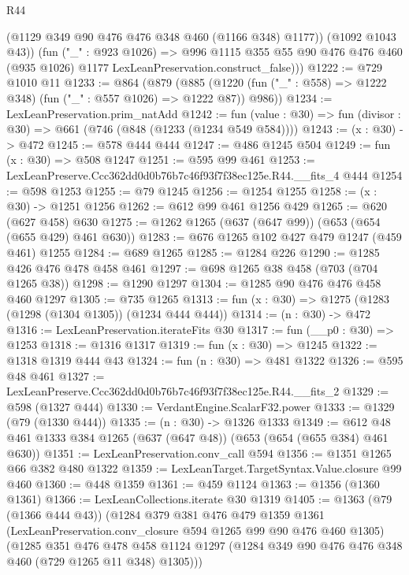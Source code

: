 \begin{lexlean}{R44}
\begin{coremodule}
            (@1129 @349 @90 @476 @476 @348 @460 (@1166 @348) @1177))
          (@1092 @1043 @43))
        (fun ("_" : @923 @1026) =>
        @996
          @1115
          @355
          @55
          @90
          @476
          @476
          @460
          (@935 @1026)
          @1177
          LexLeanPreservation.construct_false)))
@1222 := @729 @1010 @11
@1233 := @864
    (@879
      (@885 (@1220 (fun ("_" : @558) => @1222 @348) (fun ("_" : @557 @1026) => @1222 @87)) @986))
@1234 := LexLeanPreservation.prim_natAdd
@1242 := fun (value : @30) => fun (divisor : @30) => @661 (@746 (@848 (@1233 (@1234 @549 @584))))
@1243 := (x : @30) -> @472
@1245 := @578 @444 @444
@1247 := @486 @1245 @504
@1249 := fun (x : @30) => @508 @1247
@1251 := @595 @99 @461
@1253 := LexLeanPreserve.Ccc362dd0d0b76b7c46f93f7f38ec125e.R44.__fits_4 @444
@1254 := @598 @1253
@1255 := @79 @1245
@1256 := @1254 @1255
@1258 := (x : @30) -> @1251 @1256
@1262 := @612 @99 @461 @1256 @429
@1265 := @620 (@627 @458) @630
@1275 := @1262 @1265 (@637 (@647 @99)) (@653 (@654 (@655 @429) @461 @630))
@1283 := @676 @1265 @102 @427 @479 @1247 (@459 @461) @1255
@1284 := @689 @1265
@1285 := @1284 @226
@1290 := @1285 @426 @476 @478 @458 @461
@1297 := @698 @1265 @38 @458 (@703 (@704 @1265 @38))
@1298 := @1290 @1297
@1304 := @1285 @90 @476 @476 @458 @460 @1297
@1305 := @735 @1265
@1313 := fun (x : @30) => @1275 (@1283 (@1298 (@1304 @1305)) (@1234 @444 @444))
@1314 := (n : @30) -> @472
@1316 := LexLeanPreservation.iterateFits @30
@1317 := fun (__p0 : @30) => @1253
@1318 := @1316 @1317
@1319 := fun (x : @30) => @1245
@1322 := @1318 @1319 @444 @43
@1324 := fun (n : @30) => @481 @1322
@1326 := @595 @48 @461
@1327 := LexLeanPreserve.Ccc362dd0d0b76b7c46f93f7f38ec125e.R44.__fits_2
@1329 := @598 (@1327 @444)
@1330 := VerdantEngine.ScalarF32.power
@1333 := @1329 (@79 (@1330 @444))
@1335 := (n : @30) -> @1326 @1333
@1349 := @612 @48 @461 @1333 @384 @1265 (@637 (@647 @48)) (@653 (@654 (@655 @384) @461 @630))
@1351 := LexLeanPreservation.conv_call @594
@1356 := @1351 @1265 @66 @382 @480 @1322
@1359 := LexLeanTarget.TargetSyntax.Value.closure @99 @460
@1360 := @448 @1359
@1361 := @459 @1124
@1363 := @1356 (@1360 @1361)
@1366 := LexLeanCollections.iterate @30 @1319
@1405 := @1363
    (@79 (@1366 @444 @43))
    (@1284
      @379
      @381
      @476
      @479
      @1359
      @1361
      (LexLeanPreservation.conv_closure @594 @1265 @99 @90 @476 @460 @1305)
      (@1285
        @351
        @476
        @478
        @458
        @1124
        @1297
        (@1284 @349 @90 @476 @476 @348 @460 (@729 @1265 @11 @348) @1305)))

\end{coremodule}
\end{lexlean}
